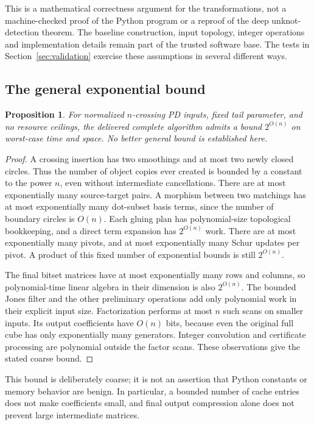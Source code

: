 \documentclass[11pt]{article}
\newtheorem{proposition}[theorem]{Proposition}
\theoremstyle{remark}\newtheorem{remark}[theorem]{Remark}
\begin{document}
This is a mathematical correctness argument for the transformations, not a
machine-checked proof of the Python program or a reproof of the deep
unknot-detection theorem. The baseline construction, input topology,
integer operations and implementation details remain part of the trusted
software base. The tests in Section~\ref{sec:validation} exercise these
assumptions in several different ways.

\subsection{The general exponential bound}
\begin{proposition}\label{prop:exp}
For normalized $n$-crossing PD inputs, fixed tail parameter, and no resource
ceilings, the delivered complete algorithm admits a bound $2^{O(n)}$ on
worst-case time and space. No better general bound is established here.
\end{proposition}
\begin{proof}
A crossing insertion has two smoothings and at most two newly closed
circles. Thus the number of object copies ever created is bounded by a
constant to the power $n$, even without intermediate cancellations.
There are at most exponentially many source-target pairs. A morphism
between two matchings has at most exponentially many dot-subset basis
terms, since the number of boundary circles is $O(n)$. Each gluing plan
has polynomial-size topological bookkeeping, and a direct term expansion
has $2^{O(n)}$ work. There are at most exponentially many pivots, and at
most exponentially many Schur updates per pivot. A product of this fixed
number of exponential bounds is still $2^{O(n)}$.

The final bitset matrices have at most exponentially many rows and columns,
so polynomial-time linear algebra in their dimension is also $2^{O(n)}$.
The bounded Jones filter and the other preliminary operations add only
polynomial work in their explicit input size. Factorization performs at
most $n$ such scans on smaller inputs. Its output coefficients have $O(n)$
bits, because even the original full cube has only exponentially many
generators. Integer convolution and certificate processing are polynomial
outside the factor scans. These observations give the stated coarse bound.
\end{proof}

This bound is deliberately coarse; it is not an assertion that Python
constants or memory behavior are benign. In particular, a bounded number
of cache entries does not make coefficients small, and final output
compression alone does not prevent large intermediate matrices.
\end{document}
